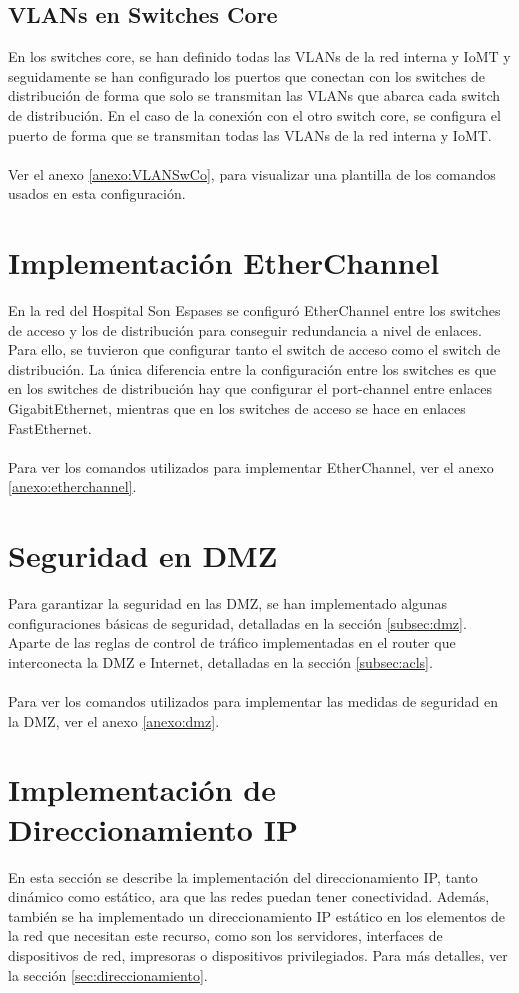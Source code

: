 \subsection{VLANs en Switches Core}
En los switches core, se han definido todas las VLANs de la red interna y IoMT y seguidamente se han configurado los puertos que conectan con los switches de distribución de forma que solo se transmitan las VLANs que abarca cada switch de distribución. En el caso de
la conexión con el otro switch core, se configura el puerto de forma que se transmitan todas las VLANs de la red interna y IoMT.
\\ \\
Ver el anexo \ref{anexo:VLANSwCo}, para visualizar una plantilla de los comandos usados en esta configuración.

\section{Implementación EtherChannel}
En la red del Hospital Son Espases se configuró EtherChannel entre los switches de acceso y los de distribución para conseguir redundancia a nivel de enlaces. Para ello, se tuvieron 
que configurar tanto el switch de acceso como el switch de distribución. La única diferencia entre la configuración entre los switches es que en los switches de distribución hay que configurar el port-channel entre enlaces GigabitEthernet, mientras 
que en los switches de acceso se hace en enlaces FastEthernet.
\\ \\
Para ver los comandos utilizados para implementar EtherChannel, ver el anexo \ref{anexo:etherchannel}.

\section{Seguridad en DMZ}
Para garantizar la seguridad en las DMZ, se han implementado algunas configuraciones básicas de seguridad, detalladas en la sección \ref{subsec:dmz}. Aparte de las reglas de control 
de tráfico implementadas en el router que interconecta la DMZ e Internet, detalladas en la sección \ref{subsec:acls}.
\\ \\
Para ver los comandos utilizados para implementar las medidas de seguridad en la DMZ, ver el anexo \ref{anexo:dmz}.

\section{Implementación de Direccionamiento IP}
En esta sección se describe la implementación del direccionamiento IP, tanto dinámico como estático, ara que las redes puedan tener conectividad. Además, también se ha 
implementado un direccionamiento IP estático en los elementos de la red que necesitan este recurso, como son los servidores, interfaces de dispositivos de red, impresoras o dispositivos privilegiados. Para más detalles, ver la sección \ref{sec:direccionamiento}.
